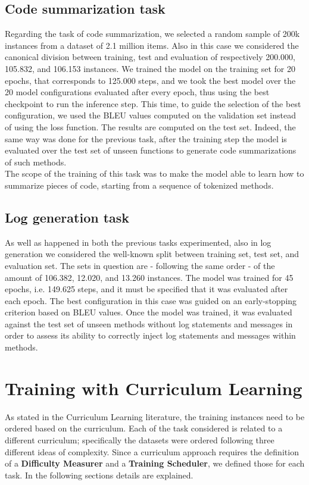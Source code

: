 \subsection{Code summarization task}
Regarding the task of code summarization, we selected a random sample of 200k instances from a dataset of 2.1 million items.
Also in this case we considered the canonical division between training, test and evaluation of respectively 200.000, 105.832, and 106.153 instances.
We trained the model on the training set for 20 epochs, that corresponds to 125.000 steps, and we took the best model over the 20 model configurations evaluated after every epoch,
thus using the best checkpoint to run the inference step. This time, to guide the selection of the best configuration, we used the BLEU values computed on the validation set instead of using
the loss function. The results are computed on the test set. Indeed, the same way was done for the previous task, after the training step the model is
evaluated over the test set of unseen functions to generate code summarizations of such methods.\\
The scope of the training of this task 
was to make the model able to learn how to summarize pieces of code, starting from a sequence of tokenized methods.

\subsection{Log generation task}
As well as happened in both the previous tasks experimented, also in log generation we considered the well-known split between training set, test set, and evaluation set.
The sets in question are - following the same order - of the amount of 106.382, 12.020, and 13.260 instances. The model was trained for 45 epochs, i.e. 149.625 steps, and 
it must be specified that it was evaluated after each epoch. The best configuration in this case was guided on an early-stopping criterion based on BLEU values. 
Once the model was trained, it was evaluated against the test set of unseen methods without log statements and messages in order to assess its ability to correctly inject log statements and messages within methods.

\section{Training with Curriculum Learning}\label{chapter:curriculum}
As stated in the Curriculum Learning literature, the training instances need to be ordered based on the curriculum.
Each of the task considered is related to a different curriculum; specifically the datasets were ordered
following three different ideas of complexity. Since a curriculum approach requires the definition of a \textbf{Difficulty Measurer}
and a \textbf{Training Scheduler}, we defined those for each task. In the following sections details are explained.

